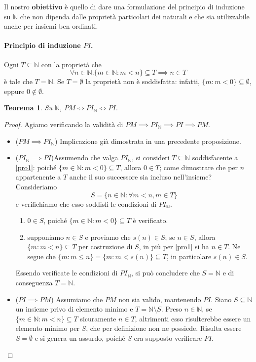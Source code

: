 \documentclass[fontsize = 11 pt, paper=A4, oneside, index=totoc, hyperref]{article}
\theoremstyle{definition}
\theoremstyle{plain}
\newtheorem{thm}{Teorema}[section]
\newcommand{\N}{\mathbb{N}}
\begin{document}
Il nostro {\bf obiettivo} è quello di dare una formulazione del principio di induzione su \(\N\) che non dipenda dalle proprietà particolari dei naturali e che sia utilizzabile anche per insiemi ben ordinati.

\paragraph{Principio di induzione \(PI\).} Ogni \(T \subseteq \N\) con la proprietà che
\begin{equation}
\forall n \in \N. \lbrace m \in \N \colon m < n\rbrace \subseteq T \implies n \in T \label{pro1}
\end{equation}
è tale che \(T = \N\). Se \(T = \emptyset\) la proprietà non è soddisfatta: infatti, \(\lbrace m \colon m < 0\rbrace \subseteq \emptyset\), eppure \(0 \notin \emptyset\).

\begin{thm}
  Su \(\N\), \(PM \iff PI_\N \iff PI\).
\end{thm}
\begin{proof}
  Agiamo verificando la validità di \(PM \implies PI_\N \implies PI \implies PM\).
  \begin{itemize}
    \item{(\(PM \implies PI_\N\))\quad} Implicazione già dimostrata in una precedente proposizione.
    \item{(\(PI_\N \implies PI\))\quad}Assumendo che valga \(PI_\N\), si consideri \(T \subseteq \N\) soddisfacente a \eqref{pro1}: poiché \(\lbrace m \in \N \colon m < 0\rbrace \subseteq T\), allora \(0 \in T\); come dimostrare che per \(n\) appartenente a \(T\) anche il suo successore sia incluso nell'insieme? Consideriamo
    \[
    S = \lbrace n \in \N \colon \forall m < n, m \in T\rbrace
    \]
    e verifichiamo che esso soddisfi le condizioni di \(PI_\N\).
    \begin{enumerate}
      \item \(0 \in S\), poiché \(\lbrace m \in \N \colon m < 0\rbrace \subseteq T\) è verificato.
      \item supponiamo \(n \in S\) e proviamo che \(s(n) \in S\); se \(n \in S\), allora \(\lbrace m \colon m < n\rbrace \subseteq T\) per costruzione di \(S\), in più per \eqref{pro1} si ha \(n \in T\). Ne segue che \(\lbrace m \colon m \le n\rbrace = \lbrace m \colon m < s(n)\rbrace \subseteq T\), in particolare \(s(n) \in S\).
    \end{enumerate}
    Essendo verificate le condizioni di \(PI_\N\), si può concludere che \(S = \N\) e di conseguenza \(T = \N\).

    \item{(\(PI \implies PM\))\quad} Assumiamo che \(PM\) non sia valido, mantenendo \(PI\). Siano \(S \subseteq \N\) un insieme privo di elemento minimo e \(T = \N \setminus S\). Preso \(n \in \N\), se \(\lbrace m \in \N \colon m < n\rbrace \subseteq T\) sicuramente \(n \in T\), altrimenti esso risulterebbe essere un elemento minimo per \(S\), che per definizione non ne possiede. Risulta essere \(S = \emptyset\) e si genera un assurdo, poiché \(S\) era supposto verificare \(PI\).
\end{itemize}
  \end{proof}
\end{document}
